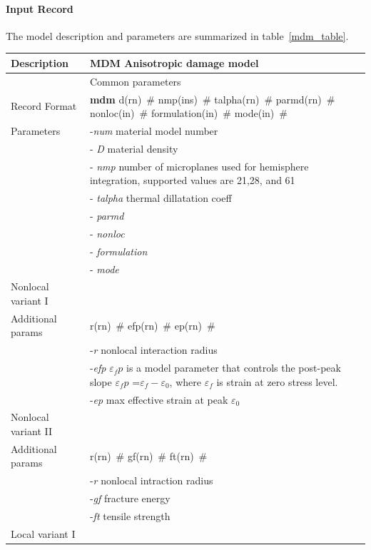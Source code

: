 \documentclass[a4paper]{article}
\newcommand{\descitem}[1]{{\noindent \bf #1}}
\newcommand{\elemparam}[2]{{{#1\tiny (#2)}~\#}}
\newcommand{\param}[1]{{\it #1}}
\begin{document}
\paragraph{Input Record}
The model description and parameters are summarized
in table~\ref{mdm_table}.

\begin{table}[!htb]
\begin{tabular}{|l|p{9cm}|}
\hline
Description & MDM Anisotropic damage model\\
\hline
& Common parameters\\
Record Format & \descitem{mdm} \elemparam{d}{rn} \elemparam{nmp}{ins} \elemparam{talpha}{rn}
\elemparam{parmd}{rn}  \elemparam{nonloc}{in}
\elemparam{formulation}{in} \elemparam{mode}{in}\\
Parameters & -\param{num} material model number\\
& - \param{D} material density\\
& - \param{nmp} number of microplanes used for hemisphere integration,
supported values are 21,28, and 61\\
& - \param{talpha}  thermal dillatation coeff\\
& - \param{parmd} \\
& - \param{nonloc} \\
& - \param{formulation}\\
& - \param{mode}\\
\hline
Nonlocal variant I&\\
Additional params &\elemparam{r}{rn} \elemparam{efp}{rn}
\elemparam{ep}{rn} \\
& -\param{r} nonlocal interaction radius\\
& -\param{efp} $\varepsilon_fp$ is a model parameter that controls
the post-peak slope $\varepsilon_fp$ =$\varepsilon_f-\varepsilon_0$,
where $\varepsilon_f$ is strain at zero stress level.\\
& -\param{ep} max effective strain at peak $\varepsilon_0$\\
\hline
Nonlocal variant II&\\
Additional params &\elemparam{r}{rn} \elemparam{gf}{rn}
\elemparam{ft}{rn}\\
& -\param{r} nonlocal intraction radius\\
& -\param{gf} fracture energy\\
& -\param{ft} tensile strength\\
\hline
Local variant I&\\

\end{tabular}
\end{table}
\end{document}
